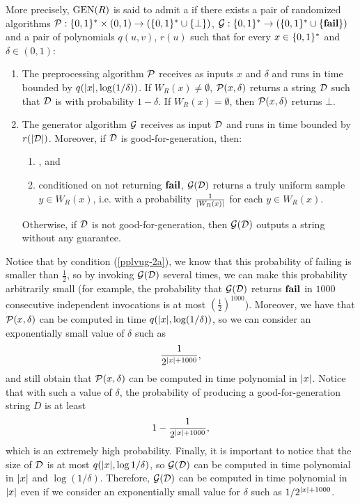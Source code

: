 \documentclass[11pt,twoside=off,numbers=noenddot]{scrbook}
\begin{document}
\begin{definition}[PPLVUG]
    More precisely, $\text{GEN}(R)$ is said to admit a  if there exists a pair of randomized algorithms $\mathcal{P} : \{ 0, 1 \}^\ast \times (0, 1) \to (\{ 0, 1 \}^\ast \cup \{ \bot \})$, $\mathcal{G} : \{ 0, 1 \}^\ast \to (\{ 0, 1 \}^\ast \cup \{ \textbf{fail} \})$ and a pair of polynomials $q(u, v)$, $r(u)$ such that for every $x \in \{ 0, 1 \}^\ast$ and $\delta \in (0, 1)$:
    \begin{enumerate}
        \item The preprocessing algorithm $\mathcal{P}$ receives as inputs $x$ and $\delta$ and runs in time bounded by $q(| x |, \log(1 / \delta))$. If $W_R(x) \neq \emptyset$, $\mathcal{P}(x, \delta)$ returns a string $\mathcal{D}$ such that $\mathcal{D}$ is  with probability $1 - \delta$. If $W_R(x) = \emptyset$, then $\mathcal{P}(x, \delta)$ returns $\bot$.
        \item The generator algorithm $\mathcal{G}$ receives as input $\mathcal{D}$ and runs in time bounded by $r(| \mathcal{D} |)$. Moreover, if $\mathcal{D}$ is good-for-generation, then:
              \begin{enumerate}
                  \item {}, and \label{pplvug-2a}
                  \item conditioned on not returning $\textbf{fail}$, $\mathcal{G}(\mathcal{D})$ returns a truly uniform sample $y \in W_R(x)$, i.e. with a probability $\frac{1}{| W_R(x) |}$ for each $y \in W_R(x)$.
              \end{enumerate}
              Otherwise, if $\mathcal{D}$ is not good-for-generation, then $\mathcal{G}(\mathcal{D})$ outputs a string without any guarantee.
    \end{enumerate}
\end{definition}

Notice that by condition (\cref{pplvug-2a}), we know that this probability of failing is smaller than $\frac{1}{2}$, so by invoking $\mathcal{G}(\mathcal{D})$ several times, we can make this probability arbitrarily small (for example, the probability that $\mathcal{G}(\mathcal{D})$ returns $\textbf{fail}$ in $1000$ consecutive independent invocations is at most $(\frac{1}{2})^{1000}$). Moreover, we have that $\mathcal{P}(x, \delta)$ can be computed in time $q(| x |, \log(1 / \delta))$, so we can consider an exponentially small value of $\delta$ such as
\[ \frac{1}{2^{| x | + 1000}}, \]
and still obtain that $\mathcal{P}(x, \delta)$ can be computed in time polynomial in $| x |$. Notice that with such a value of $\delta$, the probability of producing a good-for-generation string $D$ is at least
\[ 1 - \frac{1}{2^{| x | + 1000}}, \]
which is an extremely high probability. Finally, it is important to notice that the size of $\mathcal{D}$ is at most $q(| x |, \log{1 / \delta})$, so $\mathcal{G}(\mathcal{D})$ can be computed in time polynomial in $| x |$ and $\log(1 / \delta)$. Therefore, $\mathcal{G}(\mathcal{D})$ can be computed in time polynomial in $| x |$ even if we consider an exponentially small value for $\delta$ such as $1 / 2^{| x | + 1000}$.
\end{document}
